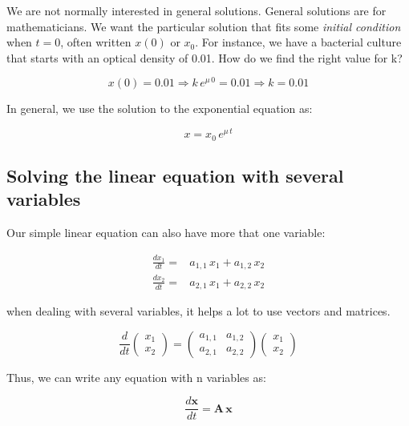 \documentclass{tufte-book} %
\begin{document}
We are not normally interested in general solutions. General solutions are for mathematicians. We want the particular solution that fits some \emph{initial condition} when $t=0$,  often written $x(0)$ or $x_0$. For instance, we have a bacterial culture that starts with an optical density of 0.01. How do we find the right value for k?


\begin{equation}
x(0) = 0.01 \Rightarrow	 k \, e^{\mu \, 0} = 0.01 \Rightarrow	k=0.01 \nonumber
\end{equation}

In general, we use the solution to the exponential equation as:

\begin{equation}
	x   = x_0 \, e^{\mu \, t} \nonumber
\end{equation}

\subsection{Solving the linear equation with several variables}


Our simple linear equation can also have more that one variable:

\begin{align}
	\label{odenvar}
	\frac{dx_1}{dt} =& a_{1,1} \, x_1 + a_{1,2} \, x_2 \nonumber\\
	\frac{dx_2}{dt} =& a_{2,1} \, x_1 + a_{2,2} \, x_2
\end{align}

when dealing with several variables, it helps a lot to use vectors and matrices.

\begin{equation}
	\frac{d}{dt} \begin{pmatrix} x_1\\ x_2 \end{pmatrix} = \begin{pmatrix} a_{1,1} & a_{1,2}\\ a_{2,1} & a_{2,2} \end{pmatrix} \begin{pmatrix} x_1\\ x_2 \end{pmatrix} \nonumber
\end{equation}

Thus, we can write any equation with n variables as:

\begin{equation}
	\label{odenvar_mat}
	\frac{d\mathbf{x}}{dt}  = \mathbf{A} \, \mathbf{x}
\end{equation}
\end{document}
